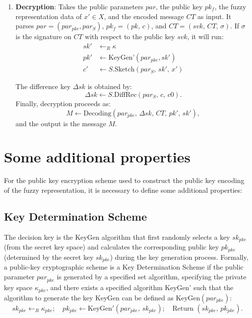 \documentclass[graybox]{svmult}
\begin{document}
\begin{enumerate}
    \item \textbf{Decryption}: Takes the public parameters \(  par \), the public key \( pk_f \), the fuzzy representation data of \( x' \in X \), and the encoded message \( CT \) as input. It parses \( par  = (par_{pke}, par_S) \), \( pk_f = (pk, \, c) \), and \( CT = (svk, \, CT, \, \sigma) \). If \( \sigma \) is the signature on \( CT \) with respect to the public key \( svk \), it will run:
          \begin{align*}
              sk' & \leftarrow_R \kappa                              \\
              pk' & \leftarrow \text{KeyGen'}(par_{pke}, sk')        \\
              c'  & \leftarrow S.\text{Sketch}(par_S, \, sk', \, x')
          \end{align*}

          The difference key \( \Delta sk \) is obtained by:
          \[
              \Delta sk \leftarrow S.\text{DiffRec}(par_S, \, c, \, c0).
          \]
          Finally, decryption proceeds as:
          \[
              M \leftarrow \text{Decoding}(par_{pke}, \, \Delta sk, \, CT, \, pk', \, sk'),
          \]
          and the output is the message \( M \).
\end{enumerate}

\section{Some additional properties}
For the public key encryption scheme used to construct the public key encoding of the fuzzy representation, it is necessary to define some additional properties:

\subsection{Key Determination Scheme}

The decision key is the KeyGen algorithm that first randomly selects a key \( sk_{pke} \) (from the secret key space) and calculates the corresponding public key \( pk_{pke} \) (determined by the secret key \( {sk}_{pke} \)) during the key generation process. Formally, a public-key cryptographic scheme is a Key Determination Scheme if the public parameter \( {par}_{pke} \) is generated by a specified set algorithm, specifying the private key space \( \kappa_{pke} \), and there exists a specified algorithm KeyGen' such that the algorithm to generate the key KeyGen can be defined as \( \text{KeyGen}(par_{pke}) \):
\[
    sk_{pke} \leftarrow_R \kappa_{pke}; \quad pk_{pke} \leftarrow \text{KeyGen}'(par_{pke}, \, sk_{pke}); \quad \text{Return } (sk_{pke}, \, pk_{pke}).
\]
\end{document}
